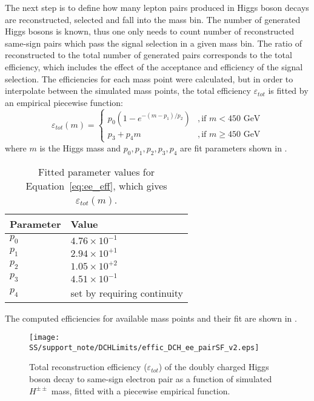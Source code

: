 The next step is to define how many lepton pairs produced in Higgs boson decays are reconstructed, selected and fall into the mass bin.
The number of generated Higgs bosons is known, 
thus one only needs to count number of reconstructed same-sign pairs which pass the signal selection in a given mass bin.
The ratio of reconstructed to the total number of generated pairs corresponds to the total efficiency, which includes the effect of the acceptance and efficiency of the signal selection.
The efficiencies for each mass point were calculated, but in order to interpolate between the simulated mass points, the total efficiency $\varepsilon_{tot}$ is fitted by
an empirical piecewise function:
\begin{equation}
\varepsilon_{tot}(m) = \begin{cases} p_{0} (1-e^{-(m-p_{1})/p_{2}}) & ,\mbox{if } m < 450\mbox{ GeV} \\ 
p_{3} + p_{4} m & ,\mbox{if } m \geq 450\mbox{ GeV} \end{cases}
\label{eq:ee_eff}
\end{equation}
where $m$ is the Higgs mass and $p_{0}, p_{1}, p_{2}, p_{3}, p_{4}$ are fit parameters shown in .
\begin{table}[htbp]
    \begin{center}
    \begin{tabular}{ l | l }
        \hline
        Parameter & Value \\
        \hline
        $p_{0}$    & $4.76 \times 10^{-1}$ \\[+0.05in]
        $p_{1}$    & $2.94 \times 10^{+1}$ \\[+0.05in]
        $p_{2}$    & $1.05 \times 10^{+2}$ \\[+0.05in]
        $p_{3}$    & $4.51 \times 10^{-1}$ \\[+0.05in]
        $p_{4}$    & set by requiring continuity \\[+0.05in]
        \hline
    \end{tabular}
    \end{center}
    \caption{Fitted parameter values for Equation~\ref{eq:ee_eff}, which gives $\varepsilon_{tot}(m)$.}
    \label{tab:ee_eff_params}
\end{table}

The computed efficiencies for available mass points and their fit are shown in .

\begin{figure}[h]
\begin{center}
\texttt{[image: SS/support\_note/DCHLimits/effic\_DCH\_ee\_pairSF\_v2.eps]}
\caption{Total reconstruction efficiency ($\varepsilon_{tot}$) of the doubly charged Higgs boson decay to same-sign electron pair as a function of simulated $H^{\pm\pm}$ mass, fitted with a piecewise empirical function.}
\label{fig:signal_efficiency}
\end{center}
\end{figure}

